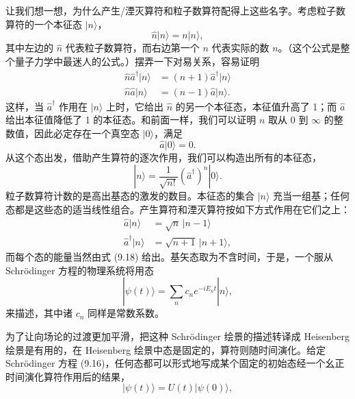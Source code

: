 让我们想一想，为什么产生/湮灭算符和粒子数算符配得上这些名字。考虑粒子数算符的一个本征态 $|n\rangle$，
\begin{equation*}
\hat{n}|n\rangle = n|n\rangle,
\tag{9.27}
\end{equation*}
其中左边的 $\hat{n}$ 代表粒子数算符，而右边第一个 $n$ 代表实际的数 $n$。（这个公式是整个量子力学中最迷人的公式。）摆弄一下对易关系，容易证明
\begin{align*}
\hat{n}\hat{a}^{\dagger}|n\rangle &= (n+1)\hat{a}^{\dagger}|n\rangle \\
\hat{n}\hat{a}|n\rangle &= (n-1)\hat{a}|n\rangle.
\tag{9.28}
\end{align*}
这样，当 $\hat{a}^{\dagger}$ 作用在 $|n\rangle$ 上时，它给出 $\hat{n}$ 的另一个本征态，本征值升高了 1；而 $\hat{a}$ 给出本征值降低了 1 的本征态。和前面一样，我们可以证明 $n$ 取从 $0$ 到 $\infty$ 的整数值，因此必定存在一个真空态 $|0\rangle$，满足
\begin{equation*}
\hat{a}|0\rangle = 0.
\tag{9.29}
\end{equation*}
从这个态出发，借助产生算符的逐次作用，我们可以构造出所有的本征态，
\begin{equation*}
|n\rangle = \frac{1}{\sqrt{n!}}\left(\hat{a}^{\dagger}\right)^{n}|0\rangle.
\tag{9.30}
\end{equation*}
粒子数算符计数的是高出基态的激发的数目。本征态的集合 $|n\rangle$ 充当一组基；任何态都是这些态的适当线性组合。产生算符和湮灭算符按如下方式作用在它们之上：
\begin{align*}
\hat{a}|n\rangle &= \sqrt{n}\,|n-1\rangle \\
\hat{a}^{\dagger}|n\rangle &= \sqrt{n+1}\,|n+1\rangle,
\tag{9.31}
\end{align*}
而每个态的能量当然由式 (9.18) 给出。基矢态取为不含时间，于是，一个服从 Schrödinger 方程的物理系统将用态
\begin{equation*}
|\psi(t)\rangle = \sum_n c_n e^{-iE_n t}|n\rangle,
\tag{9.32}
\end{equation*}
来描述，其中诸 $c_n$ 同样是常数系数。

为了让向场论的过渡更加平滑，把这种 Schrödinger 绘景的描述转译成 Heisenberg 绘景是有用的，在 Heisenberg 绘景中态是固定的，算符则随时间演化。给定 Schrödinger 方程 (9.16)，任何态都可以形式地写成某个固定的初始态经一个幺正时间演化算符作用后的结果，
\begin{equation*}
|\psi(t)\rangle = U(t)|\psi(0)\rangle,
\tag{9.33}
\end{equation*}

